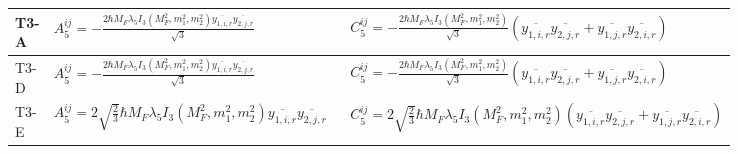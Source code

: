 \documentclass[8pt]{article}
\begin{document}
\begin{landscape}
\begin{longtable}{@{}l >{\raggedright\arraybackslash}p{0.42\linewidth} >{\raggedright\arraybackslash}p{0.42\linewidth}@{}}
\midrule
T3-A & \(\displaystyle A_5^{ij}=-\frac{2 \hbar  M_F \lambda_5 I_3\left(M_F^2,m_1^2,m_2^2\right) \overline{y_{1,i,r}} \overline{y_{2,j,r}}}{\sqrt{3}}\) & \(\displaystyle C_5^{ij}=-\frac{2 \hbar  M_F \lambda_5 I_3\left(M_F^2,m_1^2,m_2^2\right) }{\sqrt{3}}\left(\overline{y_{1,i,r}} \overline{y_{2,j,r}}+\overline{y_{1,j,r}} \overline{y_{2,i,r}}\right)\) \\
\midrule
T3-D & \(\displaystyle A_5^{ij}=-\frac{2 \hbar  M_F \lambda_5 I_3\left(M_F^2,m_1^2,m_2^2\right) \overline{y_{1,i,r}} \overline{y_{2,j,r}}}{\sqrt{3}}\) & \(\displaystyle C_5^{ij}=-\frac{2 \hbar  M_F \lambda_5 I_3\left(M_F^2,m_1^2,m_2^2\right) }{\sqrt{3}}\left(\overline{y_{1,i,r}} \overline{y_{2,j,r}}+\overline{y_{1,j,r}} \overline{y_{2,i,r}}\right)\) \\
\midrule
T3-E & \(\displaystyle A_5^{ij}=2 \sqrt{\frac{2}{3}} \hbar  M_F \lambda_5 I_3\left(M_F^2,m_1^2,m_2^2\right) \overline{y_{1,i,r}} \overline{y_{2,j,r}}\) & \(\displaystyle C_5^{ij}=2 \sqrt{\frac{2}{3}} \hbar  M_F \lambda_5 I_3\left(M_F^2,m_1^2,m_2^2\right)\left(\overline{y_{1,i,r}} \overline{y_{2,j,r}}+\overline{y_{1,j,r}} \overline{y_{2,i,r}}\right)\) \\
\midrule
\bottomrule
\end{longtable}
\end{landscape}
\end{document}
